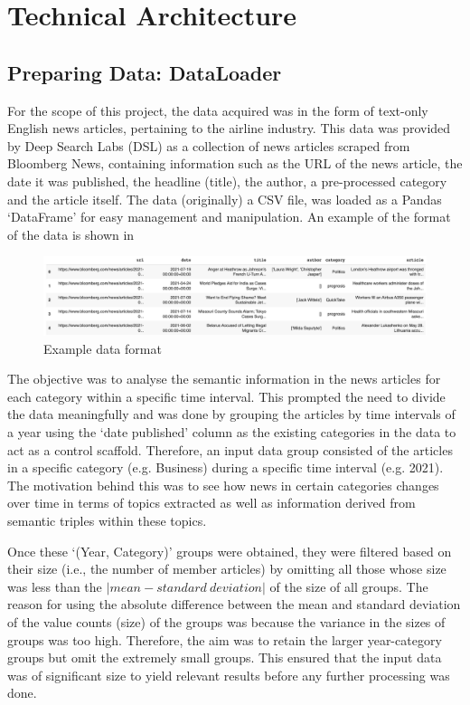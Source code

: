 \chapter{Technical Architecture}
\vspace*{-2ex}

\section{Preparing Data: DataLoader} \label{dataloader}

For the scope of this project, the data acquired was in the form of text-only English news articles, pertaining to the airline industry. This data was provided by Deep Search Labs (DSL) as a collection of news articles scraped from Bloomberg News, containing information such as the URL of the news article, the date it was published, the headline (title), the author, a pre-processed category and the article itself. The data (originally) a CSV file, was loaded as a Pandas `DataFrame' for easy management and manipulation. An example of the format of the data is shown in~

\begin{figure}[H] 
\centering
\includegraphics[width=0.8\linewidth]{images/dataframe.png}
\caption{Example data format}
\label{dataframe}
\end{figure}

The objective was to analyse the semantic information in the news articles for each category within a specific time interval. This prompted the need to divide the data meaningfully and was done by grouping the articles by time intervals of a year using the `date published' column as the existing categories in the data to act as a control scaffold. Therefore, an input data group consisted of the articles in a specific category (e.g. Business) during a specific time interval (e.g. 2021). The motivation behind this was to see how news in certain categories changes over time in terms of topics extracted as well as information derived from semantic triples within these topics.

Once these `(Year, Category)' groups were obtained, they were filtered based on their size (i.e., the number of member articles) by omitting all those whose size was less than the $| mean - standard \ deviation |$ of the size of all groups. The reason for using the absolute difference between the mean and standard deviation of the value counts (size) of the groups was because the variance in the sizes of groups was too high. Therefore, the aim was to retain the larger year-category groups but omit the extremely small groups. This ensured that the input data was of significant size to yield relevant results before any further processing was done.  

